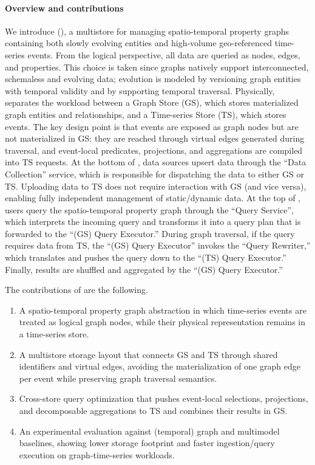 \paragraph{Overview and contributions}
We introduce \ourapproach (), a multistore for managing spatio-temporal property graphs containing both slowly evolving entities and high-volume geo-referenced time-series events.
From the logical perspective, all data are queried as nodes, edges, and properties.
This choice is taken since graphs natively support interconnected, schemaless and evolving data; evolution is modeled by versioning graph entities with temporal validity and by supporting temporal traversal.
Physically, \ourapproach separates the workload between a Graph Store (GS), which stores materialized graph entities and relationships, and a Time-series Store (TS), which stores events.
The key design point is that events are exposed as graph nodes but are not materialized in GS: they are reached through virtual edges generated during traversal, and event-local predicates, projections, and aggregations are compiled into TS requests.
At the bottom of , data sources upsert data through the ``Data Collection'' service, which is responsible for dispatching the data to either GS or TS.
Uploading data to TS does not require interaction with GS (and vice versa), enabling fully independent management of static/dynamic data.
At the top of , users query the spatio-temporal property graph through the ``Query Service'', which interprets the incoming query and transforms it into a query plan that is forwarded to the ``(GS)  Query Executor.''
During graph traversal, if the query requires data from TS, the ``(GS)  Query Executor'' invokes the ``Query Rewriter,'' which translates and pushes the query down to the ``(TS) Query Executor.''
Finally, results are shuffled and aggregated by the ``(GS)  Query Executor.''

The contributions of \ourapproach are the following.
\begin{enumerate}[label=(\roman*)]
    \item A spatio-temporal property graph abstraction in which time-series events are treated as logical graph nodes, while their physical representation remains in a time-series store.
    \item A multistore storage layout that connects GS and TS through shared identifiers and virtual edges, avoiding the materialization of one graph edge per event while preserving graph traversal semantics.
    \item Cross-store query optimization that pushes event-local selections, projections, and decomposable aggregations to TS and combines their results in GS.
    \item An experimental evaluation against (temporal) graph and multimodel baselines, showing lower storage footprint and faster ingestion/query execution on graph-time-series workloads.
\end{enumerate}


